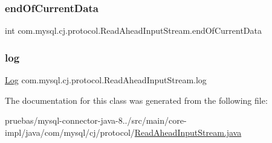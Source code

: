 \subsubsection{\texorpdfstring{end\+Of\+Current\+Data}{endOfCurrentData}}
{\footnotesize\ttfamily int com.\+mysql.\+cj.\+protocol.\+Read\+Ahead\+Input\+Stream.\+end\+Of\+Current\+Data\hspace{0.3cm}{\ttfamily [protected]}}

\mbox{\label{classcom_1_1mysql_1_1cj_1_1protocol_1_1_read_ahead_input_stream_a244243ffa076d708c4f5ba1686ce5151}} 
\subsubsection{\texorpdfstring{log}{log}}
{\footnotesize\ttfamily \mbox{\hyperlink{interfacecom_1_1mysql_1_1cj_1_1log_1_1_log}{Log}} com.\+mysql.\+cj.\+protocol.\+Read\+Ahead\+Input\+Stream.\+log\hspace{0.3cm}{\ttfamily [protected]}}



The documentation for this class was generated from the following file\+:\begin{DoxyCompactItemize}
\item 
pruebas/mysql-\/connector-\/java-\/8../src/main/core-\/impl/java/com/mysql/cj/protocol/\mbox{\hyperlink{_read_ahead_input_stream_8java}{Read\+Ahead\+Input\+Stream.\+java}}\end{DoxyCompactItemize}
